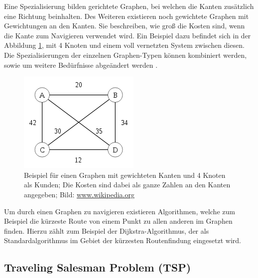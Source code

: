 \noindent
Eine Spezialisierung bilden gerichtete Graphen, bei welchen die Kanten zusätzlich eine Richtung beinhalten. 
Des Weiteren existieren noch gewichtete Graphen mit Gewichtungen an den Kanten. 
Sie beschreiben, wie groß die Kosten sind, wenn die Kante zum Navigieren verwendet wird. 
Ein Beispiel dazu befindet sich in der Abbildung \ref{fig:graph}, mit 4 Knoten und einem voll vernetzten System zwischen diesen. 
Die Spezialisierungen der einzelnen Graphen-Typen können kombiniert werden, sowie um weitere Bedürfnisse abgeändert werden \cite{wurzer2010fallbeispiele}.
\begin{figure}
	\centering
	\includegraphics[scale=0.8]{images/220px-Weighted_K4.png}
	\caption{Beispiel für einen Graphen mit gewichteten Kanten und 4 Knoten als Kunden; Die Kosten sind dabei als ganze Zahlen an den Kanten angegeben; Bild: \url{www.wikipedia.org}}
	\label{fig:graph}
\end{figure}

\noindent
Um durch einen Graphen zu navigieren existieren Algorithmen, welche zum Beispiel die kürzeste Route von einem Punkt zu allen anderen im Graphen finden. 
Hierzu zählt zum Beispiel der Dijkstra-Algorithmus, der als Standardalgorithmus im Gebiet der kürzesten Routenfindung eingesetzt wird. 


%

\subsection{Traveling Salesman Problem (TSP)}

